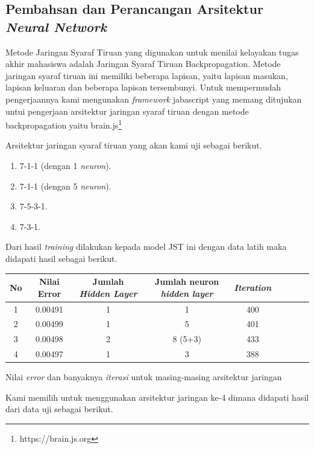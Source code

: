 \subsection{Pembahsan dan Perancangan Arsitektur \emph{Neural Network}}
Metode Jaringan Syaraf Tiruan yang digunakan untuk menilai kelayakan tugas akhir mahasiswa adalah Jaringan Syaraf Tiruan Backpropagation. Metode jaringan syaraf tiruan ini memiliki beberapa lapisan, yaitu lapisan masukan, lapisan keluaran dan beberapa lapisan tersembunyi. Untuk mempermudah pengerjaannya kami mengunakan \emph{framework} jabascript yang memang ditujukan untui pengerjaan arsitektur jaringan syaraf tiruan dengan metode backpropagation yaitu brain.js\footnote{https://brain.js.org}
\par
Arsitektur jaringan syaraf tiruan yang akan kami uji sebagai berikut.
\begin{enumerate}
	\item 7-1-1 (dengan 1 \emph{neuron}).
	\item 7-1-1 (dengan 5 \emph{neuron}).
	\item 7-5-3-1.
	\item 7-3-1.
\end{enumerate} 
Dari hasil \emph{training} dilakukan kepada model JST ini dengan data latih maka didapati hasil sebagai berikut.

\begin{center}
	\begin{tabular}{|c|c|c|c|c|c|c|c|c|}
		\hline
		No & Nilai Error & Jumlah \emph{Hidden Layer} & Jumlah neuron \emph{hidden layer} & \emph{Iteration}  \\
		\hline
		\hline
		1 & 0.00491 & 1 & 1 & 400  \\
		\hline
		2 & 0.00499 & 1 & 5 & 401  \\
		\hline
		3 & 0.00498 & 2 & 8 (5+3) & 433  \\
		\hline
		4 & 0.00497 & 1 & 3 & 388  \\
		\hline
	\end{tabular}
	\par
	\bigskip
	Nilai \emph{error} dan banyaknya \emph{iterasi} untuk masing-masing arsitektur jaringan
\end{center}

\par 
Kami memilih untuk menggunakan arsitektur jaringan ke-4 dimana didapati hasil dari data uji sebagai berikut.

